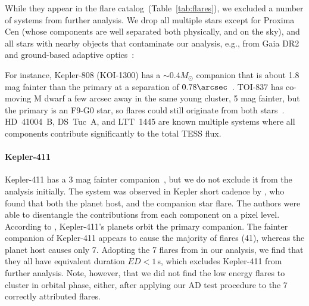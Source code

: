\documentclass[twocolumn]{aastex631}
\begin{document}
While they appear in the flare catalog~(Table~\ref{tab:flares}), we excluded a number of systems from further analysis. We drop all multiple stars except for Proxima Cen (whose components are well separated both physically, and on the sky), and all stars with nearby objects that contaminate our analysis, e.g., from Gaia DR2 and ground-based adaptive optics~\citep{ziegler2018measuring}: 

For instance, Kepler-808 (KOI-1300) has a $\sim0.4M_\odot$ \citep{kraus2016impact} companion that is about 1.8 mag fainter than the primary at a separation of $0.78\arcsec$~\citep{baranec2016roboao}. TOI-837 has co-moving M dwarf a few arcsec away in the same young cluster, 5 mag fainter, but the primary is an F9-G0 star, so flares could still originate from both stars~\citep{bouma2020cluster}. HD~41004~B, DS~Tuc~A, and LTT~1445 are known multiple systems where all components contribute significantly to the total TESS flux.


\paragraph{Kepler-411}
\label{sec:results:individualstars:kep411}
Kepler-411 has a 3 mag fainter companion~\citep{wang2014influence,ziegler2018measuring}, but we do not exclude it from the analysis initially. The system was observed in Kepler short cadence by \citet{jackman2021stellara}, who found that both the planet host, and the companion star flare. The authors were able to disentangle the contributions from each component on a pixel level. According to \citet{morton2016false, sun2019kepler411}, Kepler-411's planets orbit the primary companion. The fainter companion of Kepler-411 appears to cause the majority of flares (41), whereas the planet host causes only 7. Adopting the 7 flares from \cite{jackman2021stellara} in our analysis, we find that they all have equivalent duration $ED<1\,$s, which excludes Kepler-411 from further analysis. Note, however, that we did not find the low energy flares to cluster in orbital phase, either, after applying our AD test procedure to the 7 correctly attributed flares.
\end{document}
